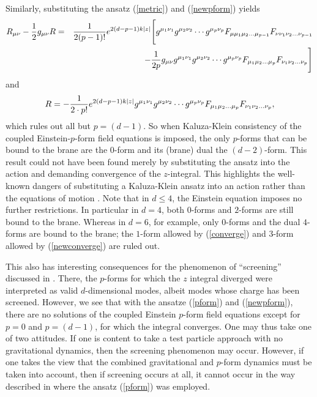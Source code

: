 \documentclass[a4paper,12pt]{article}
\def\fft#1#2{{#1\over#2}}
\begin{document}
Similarly, substituting the ansatz (\ref{metric}) and (\ref{newpform}) yields
%
\begin{eqnarray}
{R}_{\mu\nu}-\frac{1}{2}{g}_{\mu\nu}R&=& \fft1{2(p-1)!}e^{2(d-p-1)k|z|}
\Biggl[g^{\mu_{1}\nu_{1}}g^{\mu_{2}\nu_{2}}\cdots g^{\mu_{p}\nu_{p}}
{F}_{\mu\mu_{1}\mu_{2}\ldots \mu_{p-1}}
{F}_{\nu\nu_{1}\nu_{2}\ldots \nu_{p-1}}\nonumber\\
&&\kern4em-\frac{1}{2p}{g}_{\mu\nu}
g^{\mu_{1}\nu_{1}}g^{\mu_{2}\nu_{2}}\cdots g^{\mu_{p}\nu_{p}}
{F}_{\mu_{1}\mu_{2}\ldots \mu_{p}}
{F}_{\nu_{1}\nu_{2}\ldots \nu_{p}}\Biggr]
\end{eqnarray}
%
and
%
\begin{equation}
R=-\fft1{2\cdot p!}e^{2(d-p-1)k|z|}
g^{\mu_{1}\nu_{1}}g^{\mu_{2}\nu_{2}}\cdots g^{\mu_{p}\nu_{p}}
{F}_{\mu_{1}\mu_{2}\ldots \mu_{p}}
{F}_{\nu_{1}\nu_{2}\ldots \nu_{p}},
\end{equation}
%
which rules out all but $p=(d-1)$. So when Kaluza-Klein consistency of the
coupled Einstein-$p$-form field equations is imposed, the only $p$-forms that
can be bound to the brane are the $0$-form and its (brane) dual the
$(d-2)$-form. This result could not have been found merely by
substituting the ansatz into the action and demanding convergence of the
$z$-integral. This highlights the well-known dangers of substituting a
Kaluza-Klein ansatz into an action rather than the equations of
motion \cite{Duffpope}. Note that in $d\leq4$, the Einstein equation
imposes no further restrictions. In particular in $d=4$, both $0$-forms
and $2$-forms are
still bound to the brane. Whereas in $d=6$, for example, only
$0$-forms and the dual $4$-forms are bound to the brane; the
$1$-form allowed by (\ref{converge}) and $3$-form allowed by
(\ref{newconverge}) are ruled out.

This also has interesting consequences for the phenomenon of ``screening''
discussed in \cite{kaloper}. There, the $p$-forms for which the $z$ integral
diverged were interpreted as valid $d$-dimensional modes, albeit modes whose
charge has been screened. However, we see that with the ansatze
(\ref{pform}) and (\ref{newpform}), there are no solutions of the coupled
Einstein $p$-form field equations except for $p=0$ and $p=(d-1)$, for
which the
integral converges. One may thus take one of two attitudes. If one is
content to take a test particle approach with no gravitational
dynamics, then the screening phenomenon may occur.  However, if one
takes the view that the combined gravitational and $p$-form dynamics
must be taken into account, then if screening occurs at all, it cannot
occur in the way described in \cite{kaloper} where the ansatz
(\ref{pform}) was employed.
\end{document}
